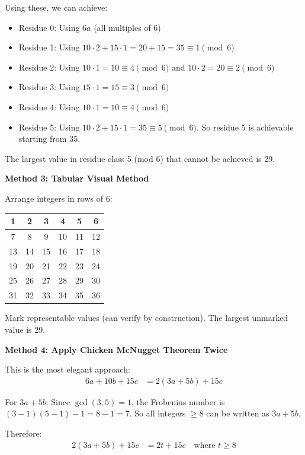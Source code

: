 \documentclass[12pt]{article}
\begin{document}
\begin{solutionbox}
Using these, we can achieve:
\begin{itemize}
    \item Residue 0: Using $6a$ (all multiples of 6)
    \item Residue 1: Using $10 \cdot 2 + 15 \cdot 1 = 20 + 15 = 35 \equiv 1 \pmod{6}$
    \item Residue 2: Using $10 \cdot 1 = 10 \equiv 4 \pmod{6}$ and $10 \cdot 2 = 20 \equiv 2 \pmod{6}$
    \item Residue 3: Using $15 \cdot 1 = 15 \equiv 3 \pmod{6}$
    \item Residue 4: Using $10 \cdot 1 = 10 \equiv 4 \pmod{6}$
    \item Residue 5: Using $10 \cdot 2 + 15 \cdot 1 = 35 \equiv 5 \pmod{6}$. So residue 5 is achievable starting from 35.
\end{itemize}

The largest value in residue class 5 (mod 6) that cannot be achieved is 29.

\textbf{Method 3: Tabular Visual Method}

Arrange integers in rows of 6:
\begin{center}
\begin{tabular}{|c|c|c|c|c|c|}
\hline
1 & 2 & 3 & 4 & 5 & 6 \\
\hline
7 & 8 & 9 & 10 & 11 & 12 \\
\hline
13 & 14 & 15 & 16 & 17 & 18 \\
\hline
19 & 20 & 21 & 22 & 23 & 24 \\
\hline
25 & 26 & 27 & 28 & 29 & 30 \\
\hline
31 & 32 & 33 & 34 & 35 & 36 \\
\hline
\end{tabular}
\end{center}

Mark representable values (can verify by construction). The largest unmarked value is 29.

\textbf{Method 4: Apply Chicken McNugget Theorem Twice}

This is the most elegant approach:
\begin{align}
6a + 10b + 15c &= 2(3a + 5b) + 15c
\end{align}

For $3a + 5b$: Since $\gcd(3, 5) = 1$, the Frobenius number is $(3-1)(5-1) - 1 = 8 - 1 = 7$. So all integers $\geq 8$ can be written as $3a + 5b$.

Therefore:
\begin{align}
2(3a + 5b) + 15c &= 2t + 15c \quad \text{where } t \geq 8
\end{align}


\end{solutionbox}
\end{document}

